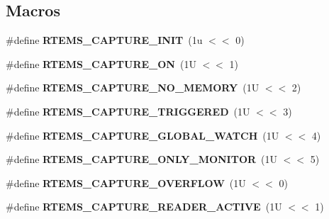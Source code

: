 \subsection*{Macros}
\begin{DoxyCompactItemize}
\item 
\mbox{\label{group__libmisc__capture_ga567005c8c2d2a6ba77afb643484d7930}} 
\#define {\bfseries R\+T\+E\+M\+S\+\_\+\+C\+A\+P\+T\+U\+R\+E\+\_\+\+I\+N\+IT}~(1u $<$$<$ 0)
\item 
\mbox{\label{group__libmisc__capture_ga621cea36f8bef7bc63380c768281830a}} 
\#define {\bfseries R\+T\+E\+M\+S\+\_\+\+C\+A\+P\+T\+U\+R\+E\+\_\+\+ON}~(1\+U $<$$<$ 1)
\item 
\mbox{\label{group__libmisc__capture_ga4db6cf77d36a4bb09a4bc4804fa84b38}} 
\#define {\bfseries R\+T\+E\+M\+S\+\_\+\+C\+A\+P\+T\+U\+R\+E\+\_\+\+N\+O\+\_\+\+M\+E\+M\+O\+RY}~(1\+U $<$$<$ 2)
\item 
\mbox{\label{group__libmisc__capture_ga9974c1b9a5e0cd5a6fb783efa0377167}} 
\#define {\bfseries R\+T\+E\+M\+S\+\_\+\+C\+A\+P\+T\+U\+R\+E\+\_\+\+T\+R\+I\+G\+G\+E\+R\+ED}~(1\+U $<$$<$ 3)
\item 
\mbox{\label{group__libmisc__capture_ga5ce0fb0bd36ea371f0c8b14358c26da4}} 
\#define {\bfseries R\+T\+E\+M\+S\+\_\+\+C\+A\+P\+T\+U\+R\+E\+\_\+\+G\+L\+O\+B\+A\+L\+\_\+\+W\+A\+T\+CH}~(1\+U $<$$<$ 4)
\item 
\mbox{\label{group__libmisc__capture_ga7a6c386e2201c74ba26f752eb402daf3}} 
\#define {\bfseries R\+T\+E\+M\+S\+\_\+\+C\+A\+P\+T\+U\+R\+E\+\_\+\+O\+N\+L\+Y\+\_\+\+M\+O\+N\+I\+T\+OR}~(1\+U $<$$<$ 5)
\item 
\mbox{\label{group__libmisc__capture_ga81665b20165a4591b187477f9d8ac580}} 
\#define {\bfseries R\+T\+E\+M\+S\+\_\+\+C\+A\+P\+T\+U\+R\+E\+\_\+\+O\+V\+E\+R\+F\+L\+OW}~(1\+U $<$$<$ 0)
\item 
\mbox{\label{group__libmisc__capture_ga3e1bb3af05ab801b25e666e28a02a50d}} 
\#define {\bfseries R\+T\+E\+M\+S\+\_\+\+C\+A\+P\+T\+U\+R\+E\+\_\+\+R\+E\+A\+D\+E\+R\+\_\+\+A\+C\+T\+I\+VE}~(1\+U $<$$<$ 1)

\end{DoxyCompactItemize}

